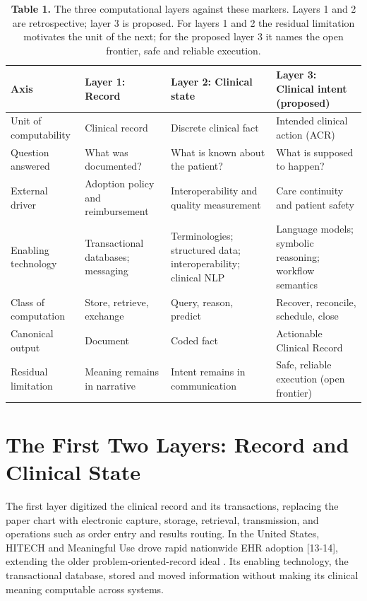 \begin{table}[htbp]
\centering
\caption{\textbf{Table 1.} The three computational layers against these markers. Layers 1 and 2 are retrospective; layer 3 is proposed. For layers 1 and 2 the residual limitation motivates the unit of the next; for the proposed layer 3 it names the open frontier, safe and reliable execution.}
\small\setlength{\tabcolsep}{4pt}%
\setlength{\tabcolsep}{4pt}
\begin{tabularx}{\textwidth}{>{\hsize=0.653\hsize\raggedright\arraybackslash}X >{\hsize=0.881\hsize\raggedright\arraybackslash}X >{\hsize=1.279\hsize\raggedright\arraybackslash}X >{\hsize=1.187\hsize\raggedright\arraybackslash}X}
\toprule
Axis & Layer 1: Record & Layer 2: Clinical state & Layer 3: Clinical intent (proposed) \\
\midrule
Unit of computability & Clinical record & Discrete clinical fact & Intended clinical action (ACR) \\
Question answered & What was documented? & What is known about the patient? & What is supposed to happen? \\
External driver & Adoption policy and reimbursement & Interoperability and quality measurement & Care continuity and patient safety \\
Enabling technology & Transactional databases; messaging & Terminologies; structured data; interoperability; clinical NLP & Language models; symbolic reasoning; workflow semantics \\
Class of computation & Store, retrieve, exchange & Query, reason, predict & Recover, reconcile, schedule, close \\
Canonical output & Document & Coded fact & Actionable Clinical Record \\
Residual limitation & Meaning remains in narrative & Intent remains in communication & Safe, reliable execution (open frontier) \\
\bottomrule
\end{tabularx}
\end{table}

\section{The First Two Layers: Record and Clinical State}\label{the-first-two-layers-record-and-clinical-state}

The first layer digitized the clinical record and its transactions, replacing the paper chart with electronic capture, storage, retrieval, transmission, and operations such as order entry and results routing. In the United States, HITECH and Meaningful Use drove rapid nationwide EHR adoption {[}13-14{]}, extending the older problem-oriented-record ideal \cite{ref15}. Its enabling technology, the transactional database, stored and moved information without making its clinical meaning computable across systems.

